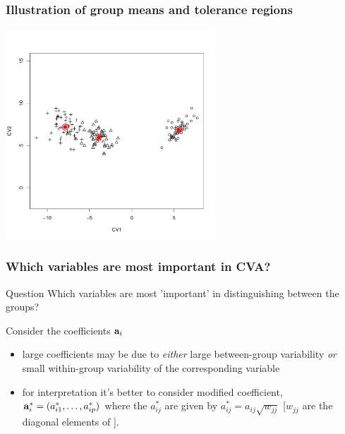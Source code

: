 \documentclass{beamer}
\begin{document}
\begin{frame}
  \frametitle{Illustration of group means and tolerance regions}

\begin{center}
\includegraphics[height=3.1in]{iris-CVA-meantol}
\end{center}

\end{frame}


\begin{frame}
  \frametitle{Which variables are most important in CVA?}

\begin{block}{Question}
Which variables are most 'important' in distinguishing between the groups?
\end{block}

Consider the coefficients $\mathbf{a}_i$
\begin{itemize}
\item large coefficients may be due to \emph{either} large between-group variability \emph{or} small within-group variability of the corresponding variable
\item for interpretation it's better to consider modified coefficient, $\mathbf{a}_{i}^{*} = (a_{i1}^{*},\ldots,a_{ip}^{*})$ where the $a_{ij}^{*}$ are given by $a_{ij}^{*} = a_{ij}\sqrt{w_{jj}}$ [$w_{jj}$ are the diagonal elements of ].
\end{itemize}

\end{frame}


% 
% 
\end{document}
